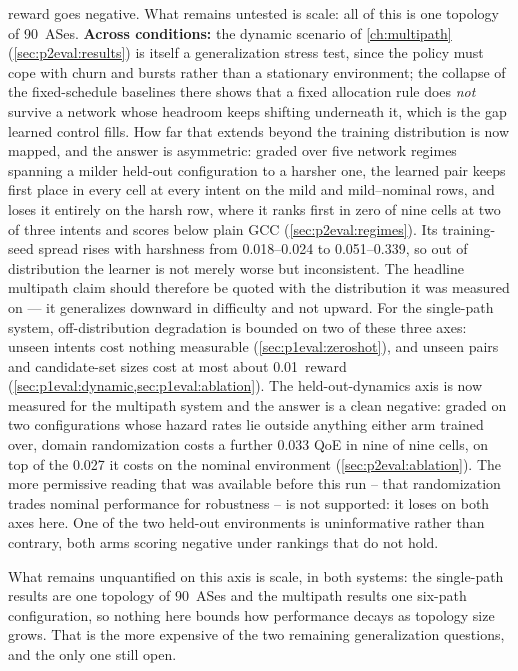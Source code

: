 reward goes negative. What remains untested is scale: all of this is one topology of 90~ASes.
\textbf{Across conditions:} the dynamic scenario of
\cref{ch:multipath}
(\cref{sec:p2eval:results}) is itself a generalization stress test, since the policy must cope with churn
and bursts rather than a stationary environment; the collapse of the fixed-schedule baselines there shows
that a fixed allocation rule does \emph{not} survive a network whose headroom keeps shifting underneath
it, which is the gap learned control fills. How far that extends beyond the training distribution is now
mapped, and the answer is asymmetric: graded over five network regimes spanning a milder held-out
configuration to a harsher one, the learned pair keeps first place in every cell at every intent on the
mild and mild--nominal rows, and loses it entirely on the harsh row, where it ranks first in zero of nine
cells at two of three intents and scores below plain GCC (\cref{sec:p2eval:regimes}). Its training-seed
spread rises with harshness from 0.018--0.024 to 0.051--0.339, so out of distribution the learner is not
merely worse but inconsistent. The headline multipath claim should therefore be quoted with the
distribution it was measured on --- it generalizes downward in difficulty and not upward.
For the single-path system, off-distribution degradation is bounded on two of these three axes:
unseen intents cost nothing measurable (\cref{sec:p1eval:zeroshot}), and unseen pairs and candidate-set
sizes cost at most about 0.01~reward (\cref{sec:p1eval:dynamic,sec:p1eval:ablation}).
The held-out-dynamics axis is now measured for the multipath system and the answer is a clean negative:
graded on two configurations whose hazard rates lie outside anything either arm trained over, domain
randomization costs a further 0.033 QoE in nine of nine cells, on top of the 0.027 it costs on the
nominal environment (\cref{sec:p2eval:ablation}). The more permissive reading that was available before
this run -- that randomization trades nominal performance for robustness -- is not supported: it loses on
both axes here. One of the two held-out environments is uninformative rather than contrary, both arms
scoring negative under rankings that do not hold.

What remains unquantified on this axis is scale, in both systems: the single-path results are one
topology of 90~ASes and the multipath results one six-path configuration, so nothing here bounds how
performance decays as topology size grows. That is the more expensive of the two remaining
generalization questions, and the only one still open.

